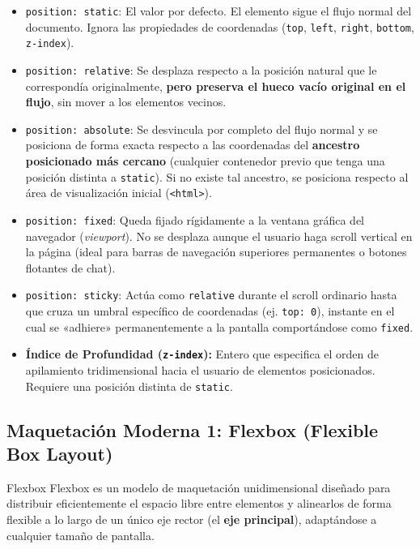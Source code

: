 \begin{itemize}[leftmargin=1.2cm]
  \item \texttt{position: static}: El valor por defecto. El elemento sigue el flujo normal del documento. Ignora las propiedades de coordenadas (\texttt{top}, \texttt{left}, \texttt{right}, \texttt{bottom}, \texttt{z-index}).
  \item \texttt{position: relative}: Se desplaza respecto a la posición natural que le correspondía originalmente, \textbf{pero preserva el hueco vacío original en el flujo}, sin mover a los elementos vecinos.
  \item \texttt{position: absolute}: Se desvincula por completo del flujo normal y se posiciona de forma exacta respecto a las coordenadas del \textbf{ancestro posicionado más cercano} (cualquier contenedor previo que tenga una posición distinta a \texttt{static}). Si no existe tal ancestro, se posiciona respecto al área de visualización inicial (\texttt{<html>}).
  \item \texttt{position: fixed}: Queda fijado rígidamente a la ventana gráfica del navegador (\textit{viewport}). No se desplaza aunque el usuario haga scroll vertical en la página (ideal para barras de navegación superiores permanentes o botones flotantes de chat).
  \item \texttt{position: sticky}: Actúa como \texttt{relative} durante el scroll ordinario hasta que cruza un umbral específico de coordenadas (ej. \texttt{top: 0}), instante en el cual se «adhiere» permanentemente a la pantalla comportándose como \texttt{fixed}.
  \item \textbf{Índice de Profundidad (\texttt{z-index}):} Entero que especifica el orden de apilamiento tridimensional hacia el usuario de elementos posicionados. Requiere una posición distinta de \texttt{static}.
\end{itemize}

\subsection{Maquetación Moderna 1: Flexbox (Flexible Box Layout)}

\begin{definicion}{Flexbox}
Flexbox es un modelo de maquetación unidimensional diseñado para distribuir eficientemente el espacio libre entre elementos y alinearlos de forma flexible a lo largo de un único eje rector (el \textbf{eje principal}), adaptándose a cualquier tamaño de pantalla.
\end{definicion}

